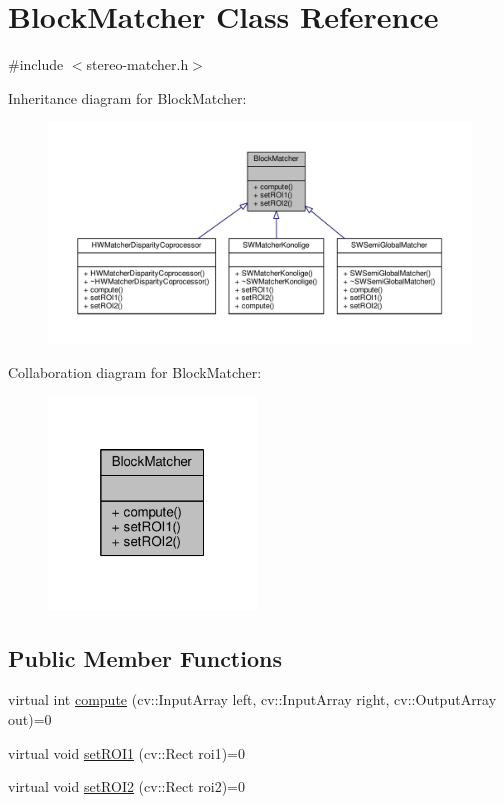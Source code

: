 \hypertarget{classBlockMatcher}{}\section{Block\+Matcher Class Reference}
\label{classBlockMatcher}


{\ttfamily \#include $<$stereo-\/matcher.\+h$>$}



Inheritance diagram for Block\+Matcher\+:
\nopagebreak
\begin{figure}[H]
\begin{center}
\leavevmode
\includegraphics[width=350pt]{classBlockMatcher__inherit__graph}
\end{center}
\end{figure}


Collaboration diagram for Block\+Matcher\+:
\nopagebreak
\begin{figure}[H]
\begin{center}
\leavevmode
\includegraphics[width=157pt]{classBlockMatcher__coll__graph}
\end{center}
\end{figure}
\subsection*{Public Member Functions}
\begin{DoxyCompactItemize}
\item 
virtual int \hyperlink{classBlockMatcher_ae37e0c58790f4604f51549c518684c64}{compute} (cv\+::\+Input\+Array left, cv\+::\+Input\+Array right, cv\+::\+Output\+Array out)=0
\item 
virtual void \hyperlink{classBlockMatcher_a0b1c689296bea9085be223e53ba538a0}{set\+R\+O\+I1} (cv\+::\+Rect roi1)=0
\item 
virtual void \hyperlink{classBlockMatcher_af80a89fda1b2fd2d78e75e7466dcbcca}{set\+R\+O\+I2} (cv\+::\+Rect roi2)=0
\end{DoxyCompactItemize}


